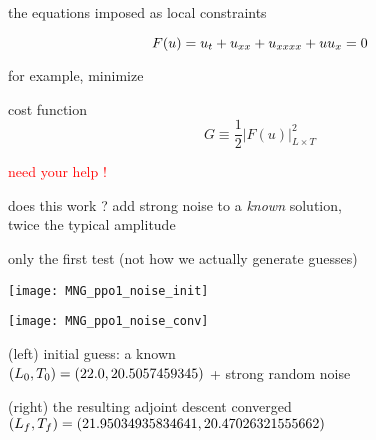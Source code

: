 \begin{frame}{the equations imposed as local constraints}
\begin{block}{\KSe}
\[
F(u) = u_t + u_{x x} + u_{x x x x} + u u_{x} = 0
\]
\end{block}
\bigskip\bigskip
for example, minimize
\begin{block}{cost function}
\[
G \equiv \frac{1}{2} |F(u)|^2_{L \times T}
\]
\end{block}
\vfill\hfill\textcolor{red}{\Huge need your help !}
\end{frame}

\begin{frame}{does this work ?}
add strong noise to a \emph{known} solution, \\ twice the typical amplitude
\begin{block}{only the first test}
{\scriptsize (not how we actually generate guesses)} \\
\begin{minipage}[height=.32\textheight]{.35\textwidth}
\centering %
\texttt{[image: MNG\_ppo1\_noise\_init]}
\end{minipage}
    \qquad
\begin{minipage}[height=.32\textheight]{.35\textwidth}
\centering %
\texttt{[image: MNG\_ppo1\_noise\_conv]}
\end{minipage}
\end{block}

{\scriptsize (left) initial guess: a known %
\twot} \\
$({L_{0}},{T_{0}})=(22.0,20.5057459345)$
+
strong random noise
\medskip

{\scriptsize (right) the resulting adjoint descent converged \twot} \\
$({L_{f}},{T_{f}})=(21.95034935834641,20.47026321555662)$
\end{frame}

